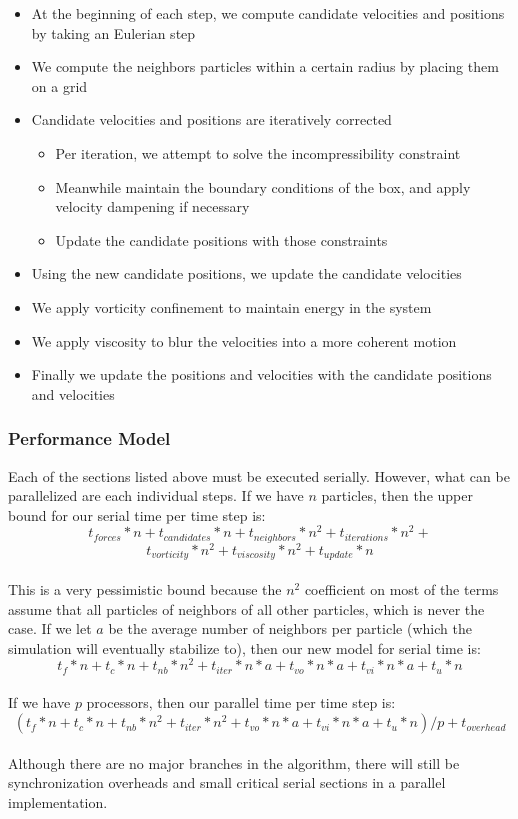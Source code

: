 \documentclass{scrartcl}
\begin{document}
    \begin{itemize}
        \item At the beginning of each step, we compute candidate velocities and positions by taking an Eulerian step
        \item We compute the neighbors particles within a certain radius by placing them on a grid
        \item Candidate velocities and positions are iteratively corrected
        \begin{itemize}
            \item Per iteration, we attempt to solve the incompressibility constraint
            \item Meanwhile maintain the boundary conditions of the box, and apply velocity dampening if necessary
            \item Update the candidate positions with those constraints
        \end{itemize}
        \item Using the new candidate positions, we update the candidate velocities
        \item We apply vorticity confinement to maintain energy in the system
        \item We apply viscosity to blur the velocities into a more coherent motion
        \item Finally we update the positions and velocities with the candidate positions and velocities
    \end{itemize}
    
        
     \subsubsection{Performance Model}
        Each of the sections listed above must be executed serially. However, what can be parallelized are each individual steps.
        If we have $n$ particles, then the upper bound for our serial time per time step is:
        \\
        $$t_{forces} * n + t_{candidates} * n + t_{neighbors} * n^2 + t_{iterations} * n^2 +$$
        $$t_{vorticity} * n^2 + t_{viscosity} * n^2 + t_{update} * n$$
        \\
        This is a very pessimistic bound because the $n^2$ coefficient on most of the terms assume that all particles of neighbors of all other particles, which is never the case. If we let $a$ be the average number of neighbors per particle (which the simulation will eventually stabilize to), then our new model for serial time is:
        \\
        $$t_{f} * n + t_{c} * n + t_{nb} * n^2 + t_{iter} * n * a + t_{vo} * n * a + t_{vi} * n * a + t_{u} * n$$
        \\
        If we have $p$ processors, then our parallel time per time step is:
        \\
        $$(t_{f} * n + t_{c} * n + t_{nb} * n^2 + t_{iter} * n^2 + t_{vo} * n * a + t_{vi} * n * a + t_{u} * n) / p + t_{overhead}$$
        \\
        Although there are no major branches in the algorithm, there will still be synchronization overheads and small critical serial sections in a parallel implementation.
    
\end{document}

